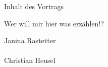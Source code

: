 




\begin{frame}[fragile]
    \maketitle{}
\end{frame}

\begin{frame}{Inhalt des Vortrags}
    \begin{minipage}[t]{0.515\textwidth}
        \tableofcontents[hideallsubsections, sections={1-5}]
    \end{minipage}
    \begin{minipage}[t]{0.475\textwidth}
        \tableofcontents[hideallsubsections, sections={6-11}]
    \end{minipage}
\end{frame}

\begin{frame}{Wer will mir hier was erzählen!?}
    \vfill
    \begin{center}
        {\Large Janina Rastetter} \\
         \\
        \vspace{1em}
        {\Large Christian Heusel } \\
         \\
    \end{center}
\end{frame}

